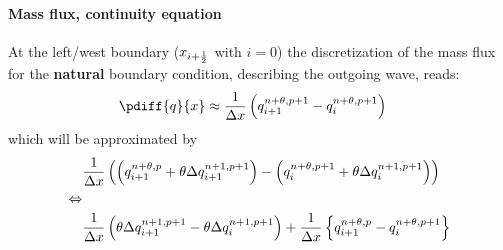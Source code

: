 \paragraph*{Mass flux, continuity equation}
At the left/west boundary ($x_{i+\frac{1}{2}}$ with $i=0$) the discretization of the mass flux for the \textbf{natural} boundary condition, describing the outgoing wave, reads:
\begin{align}
    \pdiff{q}{x} & \approx \frac{1}{\Dx} \left(  q^{n+\theta, p+1}_{i+1} - q^{n+\theta, p+1}_{i} \right)
\end{align}
which will be approximated by
\begin{align}
&\frac{1}{\Delta x} \left( \left( q^{n+\theta, p}_{i+1} + \theta \Delta q^{n+1, p+1}_{i+1}\right)
- \left( q^{n+\theta, p+1}_{i} + \theta \Delta q^{n+1, p+1}_{i}\right) \right)
\\
\Leftrightarrow &
\nonumber \\
&\frac{1}{\Delta x} \left( \theta \Delta q^{n+1, p+1}_{i+1} - \theta \Delta q^{n+1, p+1}_{i}\right) +
\frac{1}{\Delta x} \left\{ q^{n+\theta, p}_{i+1} - q^{n+\theta, p+1}_{i} \right\}
\end{align}
